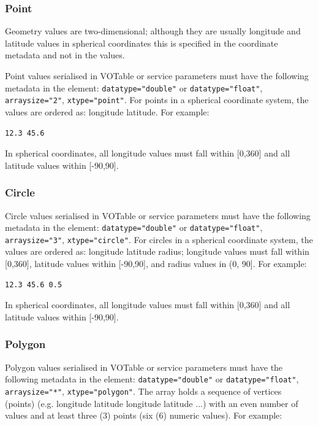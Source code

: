 \documentclass[11pt,letter]{ivoa}
\begin{document}
\subsubsection{Point}
Geometry values are two-dimensional; although they are usually longitude and 
latitude values in spherical coordinates this is specified in the coordinate 
metadata and not in the values. 

Point values serialised in VOTable or service parameters must have the following metadata in the 
 element: \verb|datatype="double"| or \verb|datatype="float"|, \verb|arraysize="2"|,
\verb|xtype="point"|. For points in a 
spherical coordinate system, the values are ordered as: longitude latitude. For 
example:

\begin{verbatim}
12.3 45.6
\end{verbatim}

In spherical coordinates, all longitude values must fall within [0,360] and all 
latitude values within [-90,90].

\subsubsection{Circle}
Circle values serialised in VOTable or service parameters must have the following metadata in the 
 element: \verb|datatype="double"| or \verb|datatype="float"|, \verb|arraysize="3"|,
\verb|xtype="circle"|. For circles 
in a spherical coordinate system, the values are ordered as: longitude latitude 
radius; longitude values must fall within [0,360], latitude values within [-90,90], and radius values in (0, 90]. For example:

\begin{verbatim}
12.3 45.6 0.5
\end{verbatim}

In spherical coordinates, all longitude values must fall within [0,360] and all 
latitude values within [-90,90].

\subsubsection{Polygon}
Polygon values serialised in VOTable or service parameters must have the following metadata in the 
 element: \verb|datatype="double"| or \verb|datatype="float"|, \verb|arraysize="*"|,
\verb|xtype="polygon"|. The 
array holds a sequence of vertices (points) (e.g. longitude latitude longitude 
latitude ...) with an even number of values and at least three (3) points (six 
(6) numeric values). For example:
\end{document}
